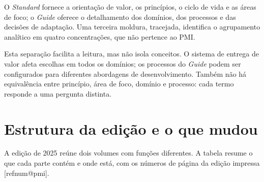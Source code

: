 \documentclass[11pt,a4paper]{article}
\makeatletter
\newcommand{\refnum}[1]{\csname refnum@#1\endcsname}
\makeatother
\begin{document}
O \textit{Standard} fornece a orientação de valor, os princípios, o ciclo de vida e as áreas de foco; o \textit{Guide} oferece o detalhamento dos domínios, dos processos e das decisões de adaptação. Uma terceira moldura, tracejada, identifica o agrupamento analítico em quatro concentrações, que não pertence ao PMI.

Esta separação facilita a leitura, mas não isola conceitos. O sistema de entrega de valor afeta escolhas em todos os domínios; os processos do \textit{Guide} podem ser configurados para diferentes abordagens de desenvolvimento. Também não há equivalência entre princípio, área de foco, domínio e processo: cada termo responde a uma pergunta distinta.

\section{Estrutura da edição e o que mudou}

A edição de 2025 reúne dois volumes com funções diferentes. A tabela resume o que cada parte contém e onde está, com os números de página da edição impressa [\refnum{pmi}].
\end{document}
